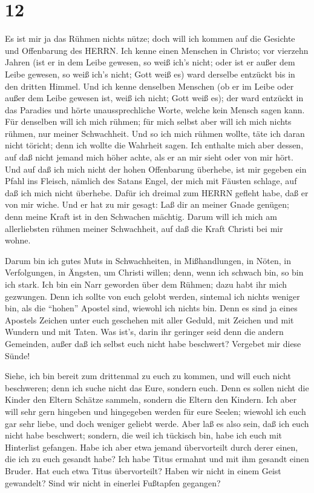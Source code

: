\hypertarget{section-11}{%
\section{12}\label{section-11}}

 Es ist mir ja das Rühmen nichts nütze; doch will ich kommen
auf die Gesichte und Offenbarung des HERRN.  Ich kenne einen
Menschen in Christo; vor vierzehn Jahren (ist er in dem Leibe gewesen,
so weiß ich's nicht; oder ist er außer dem Leibe gewesen, so weiß ich's
nicht; Gott weiß es) ward derselbe entzückt bis in den dritten Himmel.
 Und ich kenne denselben Menschen (ob er im Leibe oder außer
dem Leibe gewesen ist, weiß ich nicht; Gott weiß es);  der
ward entzückt in das Paradies und hörte unaussprechliche Worte, welche
kein Mensch sagen kann.  Für denselben will ich mich rühmen;
für mich selbst aber will ich mich nichts rühmen, nur meiner
Schwachheit.  Und so ich mich rühmen wollte, täte ich daran
nicht töricht; denn ich wollte die Wahrheit sagen. Ich enthalte mich
aber dessen, auf daß nicht jemand mich höher achte, als er an mir sieht
oder von mir hört.  Und auf daß ich mich nicht der hohen
Offenbarung überhebe, ist mir gegeben ein Pfahl ins Fleisch, nämlich des
Satans Engel, der mich mit Fäusten schlage, auf daß ich mich nicht
überhebe.  Dafür ich dreimal zum HERRN gefleht habe, daß er
von mir wiche.  Und er hat zu mir gesagt: Laß dir an meiner
Gnade genügen; denn meine Kraft ist in den Schwachen mächtig. Darum will
ich mich am allerliebsten rühmen meiner Schwachheit, auf daß die Kraft
Christi bei mir wohne.

 Darum bin ich gutes Muts in Schwachheiten, in
Mißhandlungen, in Nöten, in Verfolgungen, in Ängsten, um Christi willen;
denn, wenn ich schwach bin, so bin ich stark.  Ich bin ein
Narr geworden über dem Rühmen; dazu habt ihr mich gezwungen. Denn ich
sollte von euch gelobt werden, sintemal ich nichts weniger bin, als die
``hohen'' Apostel sind, wiewohl ich nichts bin.  Denn es
sind ja eines Apostels Zeichen unter euch geschehen mit aller Geduld,
mit Zeichen und mit Wundern und mit Taten.  Was ist's,
darin ihr geringer seid denn die andern Gemeinden, außer daß ich selbst
euch nicht habe beschwert? Vergebet mir diese Sünde!

 Siehe, ich bin bereit zum drittenmal zu euch zu kommen,
und will euch nicht beschweren; denn ich suche nicht das Eure, sondern
euch. Denn es sollen nicht die Kinder den Eltern Schätze sammeln,
sondern die Eltern den Kindern.  Ich aber will sehr gern
hingeben und hingegeben werden für eure Seelen; wiewohl ich euch gar
sehr liebe, und doch weniger geliebt werde.  Aber laß es
also sein, daß ich euch nicht habe beschwert; sondern, die weil ich
tückisch bin, habe ich euch mit Hinterlist gefangen.  Habe
ich aber etwa jemand übervorteilt durch derer einen, die ich zu euch
gesandt habe?  Ich habe Titus ermahnt und mit ihm gesandt
einen Bruder. Hat euch etwa Titus übervorteilt? Haben wir nicht in einem
Geist gewandelt? Sind wir nicht in einerlei Fußtapfen gegangen?

